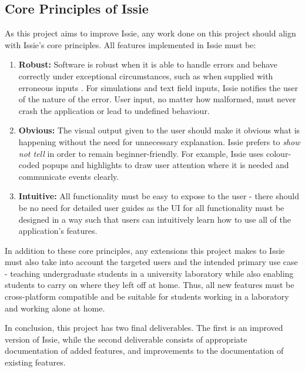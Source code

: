\subsection{Core Principles of Issie} \label{subsec:principles}
As this project aims to improve Issie, any work done on this project should align with Issie's core principles. All features implemented in Issie must be:
\begin{enumerate}
    \item \textbf{Robust:} Software is robust when it is able to handle errors and behave correctly under exceptional circumstances, such as when supplied with erroneous inputs \cite{robust}. For simulations and text field inputs, Issie notifies the user of the nature of the error. User input, no matter how malformed, must never crash the application or lead to undefined behaviour.
    \item \textbf{Obvious:} The visual output given to the user should make it obvious what is happening without the need for unnecessary explanation. Issie prefers to \textit{show not tell} in order to remain beginner-friendly. For example, Issie uses colour-coded popups and highlights to draw user attention where it is needed and communicate events clearly.
    \item \textbf{Intuitive:} All functionality must be easy to expose to the user - there should be no need for detailed user guides as the UI for all functionality must be designed in a way such that users can intuitively learn how to use all of the application's features.
\end{enumerate}

In addition to these core principles, any extensions this project makes to Issie must also take into account the targeted users and the intended primary use case - teaching undergraduate students in a university laboratory while also enabling students to carry on where they left off at home. Thus, all new features must be cross-platform compatible and be suitable for students working in a laboratory and working alone at home.

In conclusion, this project has two final deliverables. The first is an improved version of Issie, while the second deliverable consists of appropriate documentation of added features, and improvements to the documentation of existing features.



